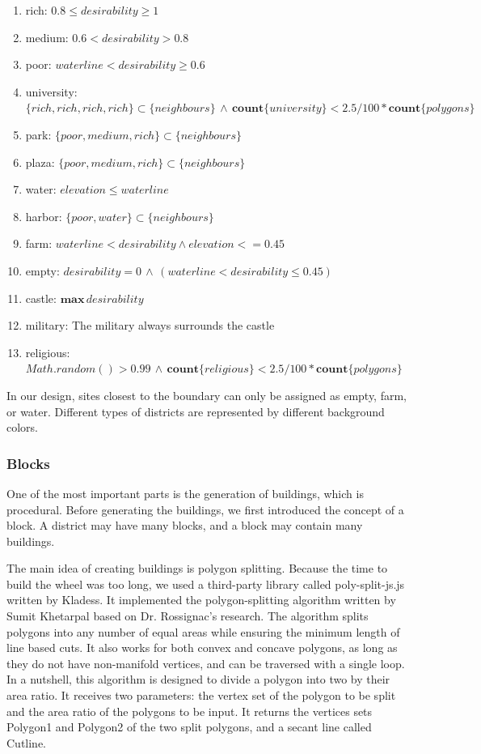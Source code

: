 \begin{enumerate}
  \item rich: $0.8 \leq desirability \geq 1$
  \item medium: $0.6 < desirability > 0.8$
  \item poor: $waterline < desirability \geq 0.6$
  \item university: $\{rich, rich, rich, rich\} \subset \{neighbours\} \, \wedge \, \mathbf{count} \{university\} < 2.5 / 100 * \mathbf{count} \{polygons\}$
  \item park: $\{poor, medium, rich\} \subset \{neighbours\}$
  \item plaza: $\{poor, medium, rich\} \subset \{neighbours\}$
  \item water: $elevation \leq waterline$
  \item harbor: $\{poor, water\} \subset \{neighbours\}$
  \item farm: $waterline < desirability \wedge elevation <= 0.45$
  \item empty: $desirability = 0 \, \wedge \, (waterline < desirability \leq 0.45)$
  \item castle: $\mathbf{max}\,desirability$
  \item military: The military always surrounds the castle
  \item religious: $Math.random() > 0.99 \, \wedge \, \mathbf{count} \{religious\} < 2.5 / 100 * \mathbf{count} \{polygons\}$
\end{enumerate}

In our design, sites closest to the boundary can only be assigned as empty, farm, or water. Different types of districts are represented by different background colors.

\subsubsection{Blocks}
One of the most important parts is the generation of buildings, which is procedural. Before generating the buildings, we first introduced the concept of a block. A district may have many blocks, and a block may contain many buildings.

The main idea of creating buildings is polygon splitting. Because the time to build the wheel was too long, we used a third-party library called poly-split-js.js written by Kladess. It implemented the polygon-splitting algorithm written by Sumit Khetarpal based on Dr. Rossignac's research. The algorithm splits polygons into any number of equal areas while ensuring the minimum length of line based cuts. It also works for both convex and concave polygons, as long as they do not have non-manifold vertices, and can be traversed with a single loop. In a nutshell, this algorithm is designed to divide a polygon into two by their area ratio. It receives two parameters: the vertex set of the polygon to be split and the area ratio of the polygons to be input. It returns the vertices sets Polygon1 and Polygon2 of the two split polygons, and a secant line called Cutline.

